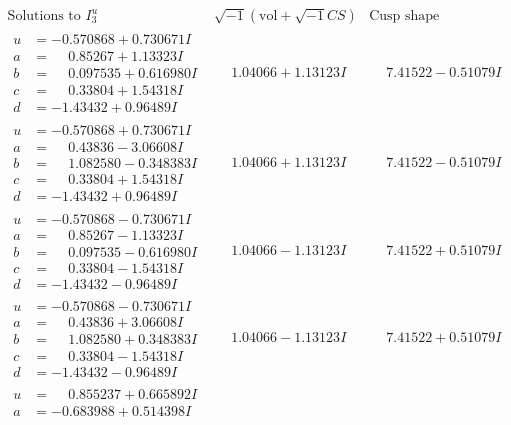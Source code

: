 \documentclass[1p]{elsarticle_modified}
\theoremstyle{definition}
\newcommand{\I}{\sqrt{-1}}
\begin{document}
$$\begin{array}{c|c|c}  
\text{Solutions to }I^u_{3}& \I (\text{vol} + \sqrt{-1}CS) & \text{Cusp shape}\\
 \hline 
\begin{aligned}
u &= -0.570868 + 0.730671 I \\
a &= \phantom{-}0.85267 + 1.13323 I \\
b &= \phantom{-}0.097535 + 0.616980 I \\
c &= \phantom{-}0.33804 + 1.54318 I \\
d &= -1.43432 + 0.96489 I\end{aligned}
 & \phantom{-}1.04066 + 1.13123 I & \phantom{-}7.41522 - 0.51079 I \\ \hline\begin{aligned}
u &= -0.570868 + 0.730671 I \\
a &= \phantom{-}0.43836 - 3.06608 I \\
b &= \phantom{-}1.082580 - 0.348383 I \\
c &= \phantom{-}0.33804 + 1.54318 I \\
d &= -1.43432 + 0.96489 I\end{aligned}
 & \phantom{-}1.04066 + 1.13123 I & \phantom{-}7.41522 - 0.51079 I \\ \hline\begin{aligned}
u &= -0.570868 - 0.730671 I \\
a &= \phantom{-}0.85267 - 1.13323 I \\
b &= \phantom{-}0.097535 - 0.616980 I \\
c &= \phantom{-}0.33804 - 1.54318 I \\
d &= -1.43432 - 0.96489 I\end{aligned}
 & \phantom{-}1.04066 - 1.13123 I & \phantom{-}7.41522 + 0.51079 I \\ \hline\begin{aligned}
u &= -0.570868 - 0.730671 I \\
a &= \phantom{-}0.43836 + 3.06608 I \\
b &= \phantom{-}1.082580 + 0.348383 I \\
c &= \phantom{-}0.33804 - 1.54318 I \\
d &= -1.43432 - 0.96489 I\end{aligned}
 & \phantom{-}1.04066 - 1.13123 I & \phantom{-}7.41522 + 0.51079 I \\ \hline\begin{aligned}
u &= \phantom{-}0.855237 + 0.665892 I \\
a &= -0.683988 + 0.514398 I \\

\end{aligned}
\end{array}$$
\end{document}

